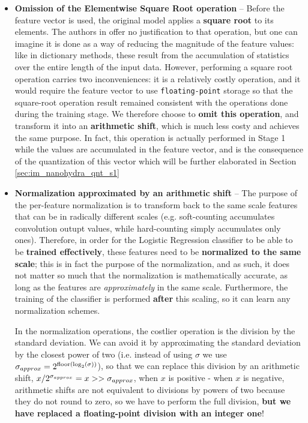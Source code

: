         \begin{itemize}
        \item \textbf{Omission of the Elementwise Square Root operation} --
        Before the feature vector is used, the original model applies a \textbf{square root} to its elements. 
        The authors in \cite{Dempster2023Hydra} offer no justification to that operation, but one can imagine it is done as a way of reducing the magnitude of the feature values: 
        like in dictionary methods, these result from the accumulation of statistics over the entire length of the input data. 
        However, performing a square root operation carries two inconveniences: it is a relatively costly operation, and it would require the feature vector 
        to use \verb|floating-point| storage so that the square-root operation result remained consistent with the operations done during the training stage.
        We therefore choose to \textbf{omit this operation}, and transform it into an \textbf{arithmetic shift}, which is much less costy and achieves the same purpose.
        In fact, this operation is actually performed in Stage 1 while the values are accumulated in the feature vector, and is the consequence of the quantization
        of this vector which will be further elaborated in Section \ref{sec:im_nanohydra_qnt_s1}

        \item \textbf{Normalization approximated by an arithmetic shift} --
        The purpose of the per-feature normalization is to transform back to the same scale features that can be in 
        radically different scales (e.g. soft-counting accumulates convolution outupt values, while hard-counting simply accumulates only ones). 
        Therefore, in order for the Logistic Regression classifier to be able to be \textbf{trained effectively}, these features need to be \textbf{normalized to the same scale}; 
        this is in fact the purpose of the normalization, and as such, it does not matter so much that the normalization is mathematically accurate, as long as the features are \emph{approximately} in the same scale. 
        Furthermore, the training of the classifier is performed \textbf{after} this scaling, so it can learn any normalization schemes.

        In the normalization operations, the costlier operation is the division by the standard deviation. We can avoid it by approximating the standard deviation by the closest
        power of two (i.e. instead of using $\sigma$ we use $\sigma\sb{approx} = 2\sp{\text{floor}(\text{log}\sb{2}(\sigma))}$), so that we can replace this division by an arithmetic 
        shift, $x / 2\sp{\sigma\sb{approx}} = x >> \sigma\sb{approx}$, when $x$ is positive - when $x$ is negative, arithmetic shifts are not equivalent to divisions by powers of two because they do not round to zero, 
        so we have to perform the full division, \textbf{but we have replaced a floating-point division with an integer one}!

        \end{itemize}

